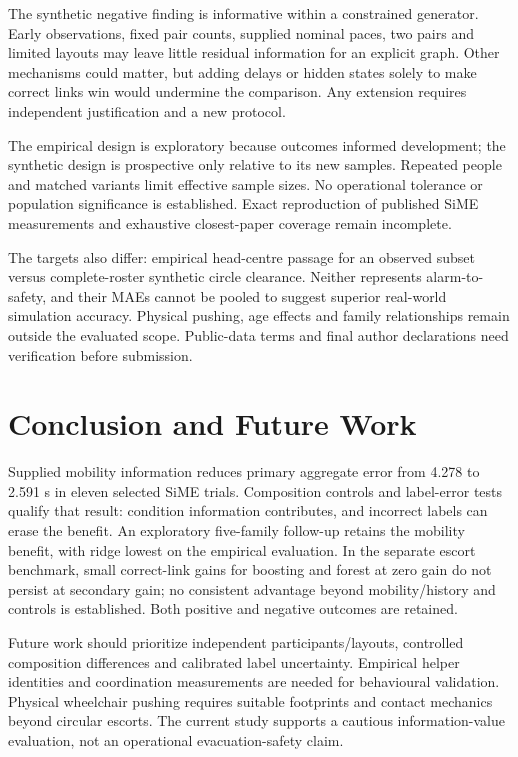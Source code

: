 \documentclass[conference]{IEEEtran}
\begin{document}
The synthetic negative finding is informative within a constrained generator. Early observations, fixed pair counts, supplied nominal paces, two pairs and limited layouts may leave little residual information for an explicit graph. Other mechanisms could matter, but adding delays or hidden states solely to make correct links win would undermine the comparison. Any extension requires independent justification and a new protocol.

The empirical design is exploratory because outcomes informed development; the synthetic design is prospective only relative to its new samples. Repeated people and matched variants limit effective sample sizes. No operational tolerance or population significance is established. Exact reproduction of published SiME measurements and exhaustive closest-paper coverage remain incomplete.

The targets also differ: empirical head-centre passage for an observed subset versus complete-roster synthetic circle clearance. Neither represents alarm-to-safety, and their MAEs cannot be pooled to suggest superior real-world simulation accuracy. Physical pushing, age effects and family relationships remain outside the evaluated scope. Public-data terms and final author declarations need verification before submission.

\section{Conclusion and Future Work}
Supplied mobility information reduces primary aggregate error from 4.278 to 2.591 s in eleven selected SiME trials. Composition controls and label-error tests qualify that result: condition information contributes, and incorrect labels can erase the benefit. An exploratory five-family follow-up retains the mobility benefit, with ridge lowest on the empirical evaluation. In the separate escort benchmark, small correct-link gains for boosting and forest at zero gain do not persist at secondary gain; no consistent advantage beyond mobility/history and controls is established. Both positive and negative outcomes are retained.

Future work should prioritize independent participants/layouts, controlled composition differences and calibrated label uncertainty. Empirical helper identities and coordination measurements are needed for behavioural validation. Physical wheelchair pushing requires suitable footprints and contact mechanics beyond circular escorts. The current study supports a cautious information-value evaluation, not an operational evacuation-safety claim.
\end{document}
